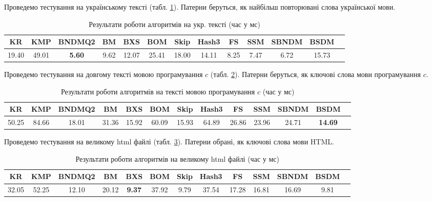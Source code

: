 \documentclass[a4paper,14pt]{extarticle} %
\begin{document}
				Проведемо тестування на українському тексті (табл. \ref{table:uniqueUkrainian}). Патерни беруться, як найбільш повторювані слова української мови.
				\begin{table}[H]
					\centering
					\scriptsize
					\begin{tabular}{|c|c|c|c|c|c|c|c|c|c|c|c|c|}
					\hline
					\textbf{KR} & \textbf{KMP} & \textbf{BNDMQ2} & \textbf{BM} & \textbf{BXS} & \textbf{BOM} & \textbf{Skip} & \textbf{Hash3} & \textbf{FS} & \textbf{SSM} & \textbf{SBNDM} & \textbf{BSDM} \\
					\hline
					19.40 & 49.01 & \textbf{5.60} & 9.62 & 12.07 & 25.41 & 18.00 & 14.11 & 8.25 & 7.47 & 6.72 & 15.73 \\
					\hline
					\end{tabular}
					\caption{Результати роботи алгоритмів на укр. тексті (час у мс)}
					\label{table:uniqueUkrainian}
				\end{table}
				
				Проведемо тестування на довгому тексті мовою програмування $c$ (табл. \ref{table:uniqueC}). Патерни беруться, як ключові слова мови програмування $c$.
				\begin{table}[H]
					\centering
					\scriptsize
					\begin{tabular}{|c|c|c|c|c|c|c|c|c|c|c|c|c|}
					\hline
					\textbf{KR} & \textbf{KMP} & \textbf{BNDMQ2} & \textbf{BM} & \textbf{BXS} & \textbf{BOM} & \textbf{Skip} & \textbf{Hash3} & \textbf{FS} & \textbf{SSM} & \textbf{SBNDM} & \textbf{BSDM} \\
					\hline
					50.25 & 84.66 & 18.01 & 31.36 & 15.92 & 60.09 & 15.93 & 64.89 & 26.86 & 23.96 & 24.71 & \textbf{14.69} \\
					\hline
					\end{tabular}
					\caption{Результати роботи алгоритмів на тексті мовою програмування $c$ (час у мс)}
					\label{table:uniqueC}
				\end{table}

				Проведемо тестування на великому html файлі (табл. \ref{table:uniqueHtml}). Патерни обрані, як ключові слова мови HTML.
				\begin{table}[H]
					\centering
					\scriptsize
					\begin{tabular}{|c|c|c|c|c|c|c|c|c|c|c|c|c|}
					\hline
					\textbf{KR} & \textbf{KMP} & \textbf{BNDMQ2} & \textbf{BM} & \textbf{BXS} & \textbf{BOM} & \textbf{Skip} & \textbf{Hash3} & \textbf{FS} & \textbf{SSM} & \textbf{SBNDM} & \textbf{BSDM} \\
					\hline
					32.05 & 52.25 & 12.10 & 20.12 & \textbf{9.37} & 37.92 & 9.79 & 37.54 & 17.28 & 16.81 & 16.69 & 9.81 \\
					\hline
					\end{tabular}
					\caption{Результати роботи алгоритмів на великому html файлі (час у мс)}
					\label{table:uniqueHtml}
				\end{table}
\end{document}
